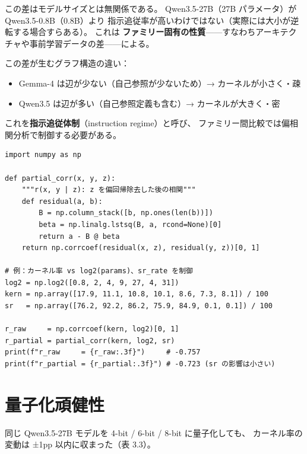 \documentclass[lang=jp, color=black, mode=simple, 11pt]{elegantbook}
\begin{document}
\begin{note}
  この差はモデルサイズとは無関係である。
  Qwen3.5-27B（27B パラメータ）が Qwen3.5-0.8B（0.8B）より
  指示追従率が高いわけではない（実際には大小が逆転する場合すらある）。
  これは \textbf{ファミリー固有の性質}——すなわちアーキテクチャや事前学習データの差——による。
\end{note}

この差が生むグラフ構造の違い：

\begin{itemize}
  \item Gemma-4 は辺が少ない（自己参照が少ないため）→ カーネルが小さく・疎
  \item Qwen3.5 は辺が多い（自己参照定義も含む）→ カーネルが大きく・密
\end{itemize}

これを\textbf{指示追従体制}（instruction regime）と呼び、
ファミリー間比較では偏相関分析で制御する必要がある。

\begin{tryit}[偏相関の実装]
\begin{lstlisting}[caption=偏相関：sr\_rateを制御したカーネル率とスケールの相関]
import numpy as np

def partial_corr(x, y, z):
    """r(x, y | z): z を偏回帰除去した後の相関"""
    def residual(a, b):
        B = np.column_stack([b, np.ones(len(b))])
        beta = np.linalg.lstsq(B, a, rcond=None)[0]
        return a - B @ beta
    return np.corrcoef(residual(x, z), residual(y, z))[0, 1]

# 例：カーネル率 vs log2(params)、sr_rate を制御
log2 = np.log2([0.8, 2, 4, 9, 27, 4, 31])
kern = np.array([17.9, 11.1, 10.8, 10.1, 8.6, 7.3, 8.1]) / 100
sr   = np.array([76.2, 92.2, 86.2, 75.9, 84.9, 0.1, 0.1]) / 100

r_raw     = np.corrcoef(kern, log2)[0, 1]
r_partial = partial_corr(kern, log2, sr)
print(f"r_raw     = {r_raw:.3f}")     # -0.757
print(f"r_partial = {r_partial:.3f}") # -0.723 (sr の影響は小さい)
\end{lstlisting}
\end{tryit}

\section{量子化頑健性}

同じ Qwen3.5-27B モデルを 4-bit / 6-bit / 8-bit に量子化しても、
カーネル率の変動は ±1pp 以内に収まった（表 3.3）。
\end{document}

